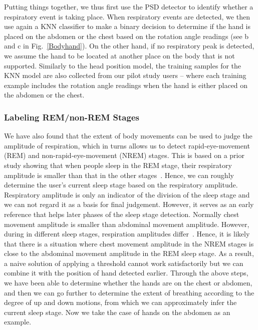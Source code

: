 {Putting things together, we thus first use the PSD detector to identify whether a respiratory event is taking place. When respiratory
events are detected, we }then use again a KNN classifier to make a binary decision to determine if the hand is placed on the abdomen or the
chest based on the rotation angle readings (see b and c in Fig.~\ref{Bodyhand}). {On the other hand, if no respiratory peak is detected, we
assume the hand to be located at another place on the body that is not supported. } Similarly to the head position model, the training
samples for the KNN model are also collected from our pilot study users -- where each training example includes the rotation angle readings
when the hand is either placed on the abdomen or the chest.

\subsubsection{Labeling REM/non-REM Stages}

We have also found that the extent of body movements can be used to judge the amplitude of respiration, which in turns allows us to detect rapid-eye-movement (REM) and non-rapid-eye-movement (NREM) stages. This is based on a prior study showing that when people sleep in the REM stage, their respiratory amplitude is smaller than that in the other stages~\cite{respiratory1982}. Hence, we can roughly determine the user's current sleep stage based on the respiratory amplitude. Respiratory amplitude is only an indicator of the division of the sleep stage and we can not regard it as a basis for final judgement.  {However, it serves as an early reference that helps later phases of the sleep stage detection. Normally chest movement amplitude is smaller than abdominal movement amplitude. However, during in different sleep stages, respiration amplitudes differ~\cite{respiratory}. Hence, it is likely that there is a situation where chest movement amplitude in the NREM stages is close to the abdominal movement amplitude in the REM sleep stage. As a result, a naive solution of applying a threshold cannot work satisfactorily but we can combine it with the position of hand detected earlier. Through the above steps, we have been able to determine whether the hands are on the chest or abdomen, and then we can go further to determine the extent of breathing according to the degree of up and down motions, from which we can approximately infer the current sleep stage}. Now we take the case of hands on the abdomen as an example.

